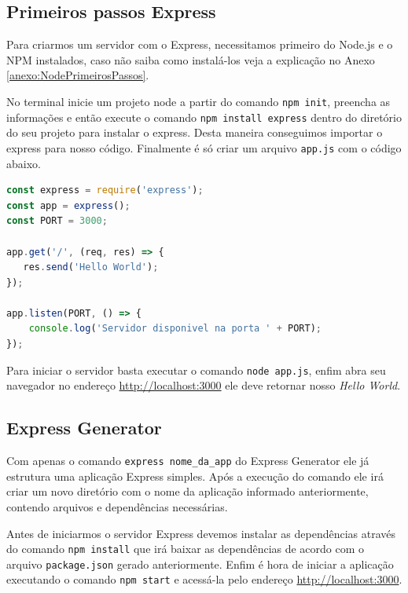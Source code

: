 \documentclass[
	12pt,				%
	openright,			%
	twoside,			%
	a4paper,			%
	english,			%
	brazil				%
	]{abntex2}
\begin{document}
\begin{anexosenv}
\chapter {Primeiros passos Express}

Para criarmos um servidor com o Express, necessitamos primeiro do Node.js e o NPM instalados, caso não saiba como instalá-los veja a explicação no Anexo \ref{anexo:NodePrimeirosPassos}.

No terminal inicie um projeto node a partir do comando \verb|npm init|, preencha as informações e então execute o comando \verb|npm install express| dentro do diretório do seu projeto para instalar o express. Desta maneira conseguimos importar o express para nosso código. Finalmente é só criar um arquivo \verb|app.js| com o código abaixo.

\begin{lstlisting}[language=javascript]
const express = require('express');
const app = express();
const PORT = 3000;

app.get('/', (req, res) => {
   res.send('Hello World');
});

app.listen(PORT, () => {
    console.log('Servidor disponivel na porta ' + PORT);
});
\end{lstlisting}

Para iniciar o servidor basta executar o comando \verb|node app.js|, enfim abra seu navegador no endereço \href{http://localhost:3000}{http://localhost:3000} ele deve retornar nosso \textit{Hello World}.

\section{Express Generator}

Com apenas o comando \verb|express nome_da_app| do Express Generator ele já estrutura uma aplicação Express simples. Após a execução do comando ele irá criar um novo diretório com o nome da aplicação informado anteriormente, contendo arquivos e dependências necessárias. 

Antes de iniciarmos o servidor Express devemos instalar as dependências através do comando \verb|npm install| que irá baixar as dependências de acordo com o arquivo \verb|package.json| gerado anteriormente. Enfim é hora de iniciar a aplicação executando o comando \verb|npm start| e acessá-la pelo endereço \href{http://localhost:3000}{http://localhost:3000}.


\end{anexosenv}
\end{document}

